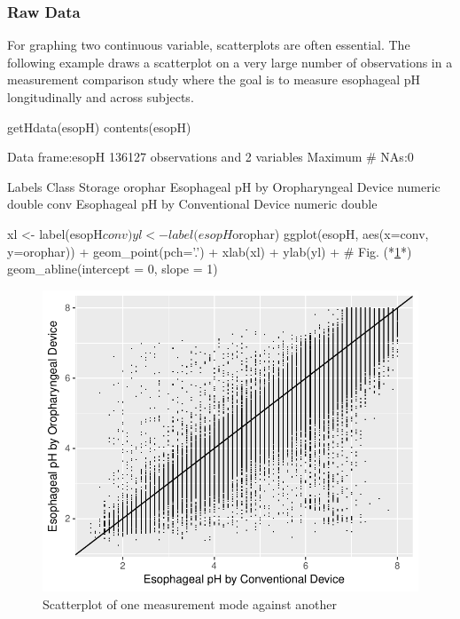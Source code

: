 \subsubsection{Raw Data}
For graphing two continuous variable, scatterplots are often
essential.  The following example draws a scatterplot on a very large
number of observations in a measurement comparison study where the
goal is to measure esophageal pH longitudinally and across subjects.
\begin{Schunk}
\begin{Sinput}
getHdata(esopH)
contents(esopH)
\end{Sinput}
\begin{Soutput}

Data frame:esopH	136127 observations and 2 variables    Maximum # NAs:0


                                       Labels   Class Storage
orophar Esophageal pH by Oropharyngeal Device numeric  double
conv     Esophageal pH by Conventional Device numeric  double
\end{Soutput}
\begin{Sinput}
xl <- label(esopH$conv)
yl <- label(esopH$orophar)
ggplot(esopH, aes(x=conv, y=orophar)) + geom_point(pch='.') +
  xlab(xl) + ylab(yl) +   # Fig. (*\ref{fig:descript-pH}*)
  geom_abline(intercept = 0, slope = 1)
\end{Sinput}
\begin{figure}[htbp]

\centerline{\includegraphics[width=\maxwidth]{descript-pH-1} }

\caption[Scatterplot of one measurement mode against another]{Scatterplot of one measurement mode against another}\label{fig:descript-pH}
\end{figure}
\end{Schunk}
